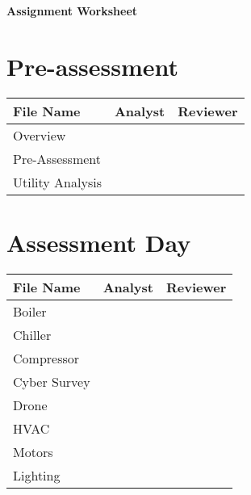 \documentclass[./main.tex]{subfiles}
\begin{document}
\begin{center}
\Large\textbf{Assignment Worksheet}
\end{center}

\renewcommand{\arraystretch}{2} %

\section*{Pre-assessment}


\begin{tabular}{|p{5cm}|p{5cm}|p{5cm}|}
\hline
\textbf{File Name} & \textbf{Analyst} & \textbf{Reviewer} \\
\hline
Overview & & \\ \hline
Pre-Assessment & & \\ \hline
Utility Analysis & & \\ \hline
\end{tabular}

\section*{Assessment Day}

\begin{tabular}{|p{5cm}|p{5cm}|p{5cm}|}
\hline
\textbf{File Name} & \textbf{Analyst} & \textbf{Reviewer} \\
\hline
Boiler & & \\ \hline
Chiller & & \\ \hline
Compressor & & \\ \hline
Cyber Survey & & \\ \hline
Drone & & \\ \hline
HVAC & & \\ \hline
Motors & & \\ \hline
Lighting & & \\ \hline
\end{tabular}


\end{document}
